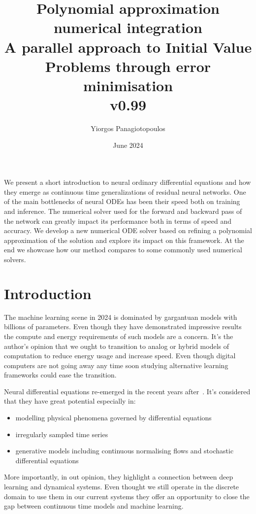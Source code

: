 \documentclass[11pt]{report}
\title{Polynomial approximation numerical integration\\ \large{A parallel approach to Initial Value Problems through error minimisation} \\ v0.99}
\author{Yiorgos Panagiotopoulos}
\date{June 2024}
\begin{document}
    \maketitle

    \abstract
    We present a short introduction to neural ordinary differential equations and how they emerge as continuous time
    generalizations of residual neural networks.
    One of the main bottlenecks of neural ODEs has been their speed both on training and inference.
    The numerical solver used for the forward and backward pass of the network can greatly impact its performance both
    in terms of speed and accuracy.
    We develop a new numerical ODE solver based on refining a polynomial approximation of the solution and explore its
    impact on this framework.
    At the end we showcase how our method compares to some commonly used numerical solvers.


    \chapter{Introduction} \label{ch:intro}
    The machine learning scene in 2024 is dominated by gargantuan models with billions of parameters.
    Even though they have demonstrated impressive results the compute and energy requirements of such models are a
    concern.
    It's the author's opinion that we ought to transition to analog or hybrid models of computation to reduce energy
    usage and increase speed.
    Even though digital computers are not going away any time soon studying alternative learning frameworks could ease
    the transition.

    Neural differential equations re-emerged in the recent years after~\cite{chen2018neural}.
    It's considered that they have great potential especially in:
    \begin{itemize}
        \item modelling physical phenomena governed by differential equations
        \item irregularly sampled time series
        \item generative models including continuous normalising flows and stochastic differential equations
    \end{itemize}
    More importantly, in out opinion, they highlight a connection between deep learning and dynamical systems.
    Even thought we still operate in the discrete domain to use them in our current systems they offer an opportunity
    to close the gap between continuous time models and machine learning.
\end{document}
